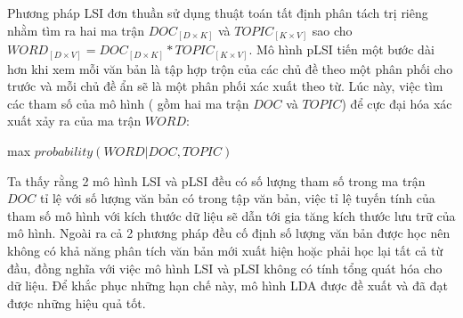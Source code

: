 \documentclass[fontsize=13pt]{scrartcl}
\begin{document}
Phương pháp LSI đơn thuần sử dụng thuật toán tất định phân tách trị riêng nhằm tìm ra hai ma trận $DOC_{[D\times K]}$ và $TOPIC_{[K\times V]}$ sao cho $WORD_{[D\times V]} = DOC_{[D\times K]} * TOPIC_{[K\times V]} $. Mô hình pLSI tiến một bước dài hơn khi xem mỗi văn bản là tập hợp trộn của các chủ đề theo một phân phối cho trước và mỗi chủ đề ẩn sẽ là một phân phối xác xuất theo từ. Lúc này, việc tìm các tham số của mô hình ( gồm hai ma trận $DOC$ và $TOPIC$) để cực đại hóa xác xuất xảy ra của ma trận $WORD$:
\begin{center}max $probability(WORD | DOC, TOPIC)$\end{center}
Ta thấy rằng 2 mô hình LSI và pLSI đều có số lượng tham số trong ma trận $DOC$ tỉ lệ với số lượng văn bản có trong tập văn bản, việc tỉ lệ tuyến tính của tham số mô hình với kích thước dữ liệu sẽ dẫn tới gia tăng kích thước lưu trữ của mô hình. Ngoài ra cả 2 phương pháp đều cố định số lượng văn bản được học nên không có khả năng phân tích văn bản mới xuất hiện hoặc phải học lại tất cả từ đầu, đồng nghĩa với việc mô hình LSI và pLSI không có tính tổng quát hóa cho dữ liệu.
Để khắc phục những hạn chế này, mô hình LDA được đề xuất và đã đạt được những hiệu quả tốt.
\end{document}
